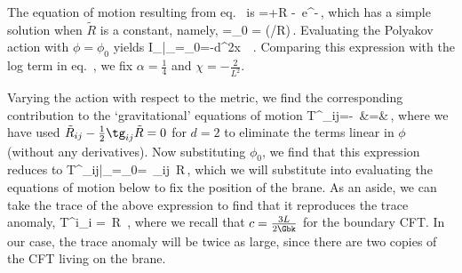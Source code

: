 The equation of motion resulting from eq.~  is
=\tilde\Box \phi +\tilde R - \chi\,e^{-\phi}\,,
\label{eom4}
\eeq
which has a simple solution when $\tilde R$ is a constant, namely,
\beq
 \phi=\phi_0 = \log(\chi/\tilde R)\,.
\label{sol4}
\eeq
Evaluating the Polyakov action with $\phi = \phi_0$ yields
\beq
 I_\big|_{\phi=\phi_0}=-\int d^2x \,  \,.
\label{PolyAct3}
\eeq
Comparing this expression with the log term in eq.~, we fix $\alpha=\frac14$ and $\chi=-\frac2{L^2}$.

Varying the action  with respect to the metric, we find the corresponding contribution to the `gravitational' equations of motion
\beqa
T^_{ij}=-\,
&=&\,,
\nonumber
\eeqa
where we have used $\tilde R_{ij} -\frac12\tg_{ij}\tilde R=0$ for $d=2$ to eliminate the terms linear in $\phi$ (without any derivatives). Now substituting $\phi_0$, we find that this expression reduces to
\beq
T^_{ij}\big|_{\phi=\phi_0}=
\,\tg_{ij}\, \tilde R\,,
\label{onshell5}
\eeq
which we will substitute into evaluating the equations of motion below to fix the position of the brane. As an aside, we can take the trace of the above expression to find
that it reproduces the trace anomaly, \eg \cite{Duff:1977ay,Duff:1993wm}
\beq\label{trace}
\langle T^i{}_i \rangle = \,\tilde R \,,
\eeq
where we recall that $c=\frac{3L}{2\Gbk}$ for the boundary CFT. In our case, the trace anomaly will be twice as large, since there are two copies of the CFT living on the brane.

